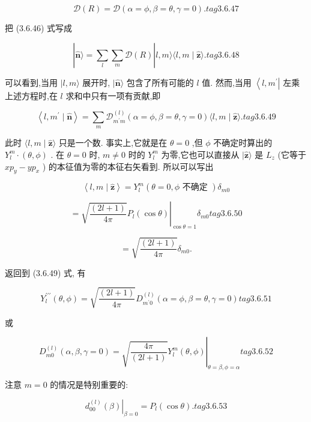 $$
\mathcal{D}\left( R\right) = \mathcal{D}\left( {\alpha = \phi ,\beta = \theta ,\gamma = 0}\right) . tag{3. 6.47}
$$

把 (3.6.46) 式写成

$$
\left| {\widehat{\mathbf{n}}\rangle = \mathop{\sum }\limits_{l}\mathop{\sum }\limits_{m}\mathcal{D}\left( R\right) }\right| l, m\rangle \langle l, m \mid \widehat{\mathbf{z}}\rangle . tag{3. 6.48}
$$

可以看到,当用 $|l, m\rangle$ 展开时, $|\widehat{\mathbf{n}}\rangle$ 包含了所有可能的 $l$ 值. 然而,当用 $\left\langle {l,{m}^{\prime }}\right|$ 左乘上述方程时,在 $l$ 求和中只有一项有贡献,即

$$
\left\langle {l,{m}^{\prime } \mid \widehat{\mathbf{n}}}\right\rangle = \mathop{\sum }\limits_{m}{\mathcal{D}}_{{m}^{\prime }m}^{\left( l\right) }\left( {\alpha = \phi ,\beta = \theta ,\gamma = 0}\right) \langle l, m \mid \widehat{\mathbf{z}}\rangle . tag{3.6.49}
$$

此时 $\langle l, m \mid \widehat{\mathbf{z}}\rangle$ 只是一个数. 事实上,它就是在 $\theta = 0$ ,但 $\phi$ 不确定时算出的 ${Y}_{l}^{m} \cdot \left( {\theta ,\phi }\right)$ . 在 $\theta = 0$ 时, $m \neq 0$ 时的 ${Y}_{l}^{m}$ 为零,它也可以直接从 $|\widehat{\mathbf{z}}\rangle$ 是 ${L}_{z}$ (它等于 $x{p}_{y} - y{p}_{x}$ ) 的本征值为零的本征右矢看到. 所以可以写出

$$
\left\langle {l, m \mid \widehat{\mathbf{z}}}\right\rangle = {Y}_{l}^{m}\left( {\theta = 0,\phi \text{ 不确定 }}\right) {\delta }_{m0}
$$

$$
= {\left. \sqrt{\frac{\left( 2l + 1\right) }{4\pi }}{P}_{l}\left( \cos \theta \right) \right| }_{\cos \theta = 1}{\delta }_{m0} tag{3. 6.50}
$$

$$
= \sqrt{\frac{\left( 2l + 1\right) }{4\pi }}{\delta }_{m0}.
$$

返回到 (3.6.49) 式, 有

$$
{Y}_{l}^{\prime \prime \prime }\left( {\theta ,\phi }\right) = \sqrt{\frac{\left( 2l + 1\right) }{4\pi }}{D}_{{m}^{\prime }0}^{\left( l\right) }\left( {\alpha = \phi ,\beta = \theta ,\gamma = 0}\right) tag{3. 6.51}
$$

或

$$
{\left. {D}_{m0}^{\left( l\right) }\left( \alpha ,\beta ,\gamma = 0\right) = \sqrt{\frac{4\pi }{\left( 2l + 1\right) }}{Y}_{l}^{m}\left( \theta ,\phi \right) \right| }_{\theta = \beta ,\phi = \alpha } tag{3. 6.52}
$$

注意 $m = 0$ 的情况是特别重要的:

$$
{\left. {d}_{00}^{\left( l\right) }\left( \beta \right) \right| }_{\beta = 0} = {P}_{l}\left( {\cos \theta }\right) . tag{3. 6.53}
$$

